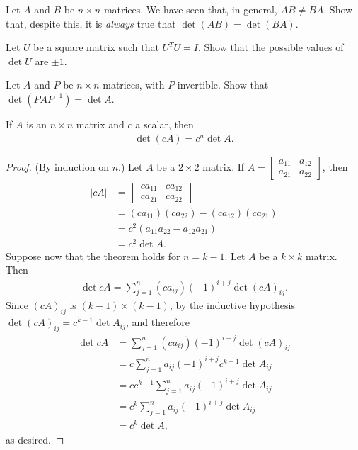 \documentclass[12pt,letterpaper,reqno]{article}
\numberwithin{equation}{section}
\begin{document}
\begin{exercise}
	Let $A$ and $B$ be $n \times n$ matrices. We have seen that, in general, $AB \neq BA$. Show that, despite this, it is \emph{always} true that $\det(AB)=\det(BA)$.
\end{exercise}

\begin{exercise}
	Let $U$ be a square matrix such that $U^TU=I$. Show that the possible values of $\det U$ are $\pm 1$.
\end{exercise}

\begin{exercise}
Let $A$ and $P$ be $n \times n$ matrices, with $P$ invertible. Show that $\det(PAP^{-1})=\det A$.	
\end{exercise}


\begin{thm}
	If $A$ is an $n \times n$ matrix and $c$ a scalar, then
	\begin{align*}
		\det (cA)=c^n\det A.
	\end{align*}
\end{thm}

\begin{proof}
	(By induction on $n$.) Let $A$ be a $2 \times 2$ matrix. If $A=\begin{bmatrix}
		a_{11} & a_{12} \\ a_{21} & a_{22}
	\end{bmatrix}$, then
	\begin{align*}
		|cA|&=\begin{vmatrix}
			ca_{11} & ca_{12} \\ ca_{21} & ca_{22}
		\end{vmatrix} \\
		&=(ca_{11})(ca_{22})-(ca_{12})(ca_{21}) \\
		&=c^2(a_{11}a_{22}-a_{12}a_{21}) \\
		&=c^2\det A.
	\end{align*}
	Suppose now that the theorem holds for $n=k-1$. Let $A$ be a $k \times k$ matrix. Then 
	\begin{align*}
		\det cA=\sum_{j=1}^n(ca_{ij})(-1)^{i+j}\det (cA)_{ij}.
	\end{align*}
	Since $(cA)_{ij}$ is $(k-1) \times (k-1)$, by the inductive hypothesis $\det (cA)_{ij}=c^{k-1}\det A_{ij}$, and therefore
	\begin{align*}
		\det cA&=\sum_{j=1}^n(ca_{ij})(-1)^{i+j}\det (cA)_{ij} \\
		&=c\sum_{j=1}^na_{ij}(-1)^{i+j}c^{k-1}\det A_{ij} \\
		&=cc^{k-1}\sum_{j=1}^na_{ij}(-1)^{i+j}\det A_{ij} \\
		&=c^k\sum_{j=1}^na_{ij}(-1)^{i+j}\det A_{ij} \\
		&=c^k\det A,
	\end{align*}
	as desired.
\end{proof}
\end{document}
